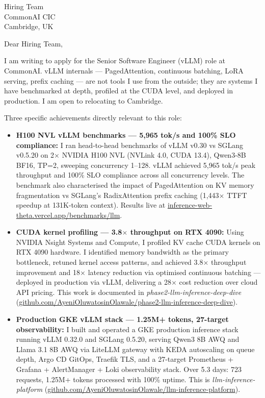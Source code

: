 \documentclass[12pt,a4paper]{letter}
\date{\today}
\begin{document}
\begin{letter}{Hiring Team \\ CommonAI CIC \\ Cambridge, UK}

\opening{Dear Hiring Team,}

I am writing to apply for the Senior Software Engineer (vLLM) role at CommonAI. vLLM internals — PagedAttention, continuous batching, LoRA serving, prefix caching — are not tools I use from the outside; they are systems I have benchmarked at depth, profiled at the CUDA level, and deployed in production. I am open to relocating to Cambridge.

Three specific achievements directly relevant to this role:

\begin{itemize}
  \item \textbf{H100 NVL vLLM benchmarks — 5,965 tok/s and 100\% SLO compliance:} I ran head-to-head benchmarks of vLLM v0.30 vs SGLang v0.5.20 on 2$\times$ NVIDIA H100 NVL (NVLink 4.0, CUDA 13.4), Qwen3-8B BF16, TP=2, sweeping concurrency 1--128. vLLM achieved 5,965 tok/s peak throughput and 100\% SLO compliance across all concurrency levels. The benchmark also characterised the impact of PagedAttention on KV memory fragmentation vs SGLang's RadixAttention prefix caching (1,443$\times$ TTFT speedup at 131K-token context). Results live at \href{https://inference-web-theta.vercel.app/benchmarks/llm}{inference-web-theta.vercel.app/benchmarks/llm}.

  \item \textbf{CUDA kernel profiling — 3.8$\times$ throughput on RTX 4090:} Using NVIDIA Nsight Systems and Compute, I profiled KV cache CUDA kernels on RTX 4090 hardware. I identified memory bandwidth as the primary bottleneck, retuned kernel access patterns, and achieved 3.8$\times$ throughput improvement and 18$\times$ latency reduction via optimised continuous batching — deployed in production via vLLM, delivering a 28$\times$ cost reduction over cloud API pricing. This work is documented in \textit{phase2-llm-inference-deep-dive} (\href{https://github.com/AyeniOluwatosinOlawale/phase2-llm-inference-deep-dive}{github.com/AyeniOluwatosinOlawale/phase2-llm-inference-deep-dive}).

  \item \textbf{Production GKE vLLM stack — 1.25M+ tokens, 27-target observability:} I built and operated a GKE production inference stack running vLLM 0.32.0 and SGLang 0.5.20, serving Qwen3 8B AWQ and Llama 3.1 8B AWQ via LiteLLM gateway with KEDA autoscaling on queue depth, Argo CD GitOps, Traefik TLS, and a 27-target Prometheus + Grafana + AlertManager + Loki observability stack. Over 5.3 days: 723 requests, 1.25M+ tokens processed with 100\% uptime. This is \textit{llm-inference-platform} (\href{https://github.com/AyeniOluwatosinOlawale/llm-inference-platform}{github.com/AyeniOluwatosinOlawale/llm-inference-platform}).
\end{itemize}


\end{letter}
\end{document}
